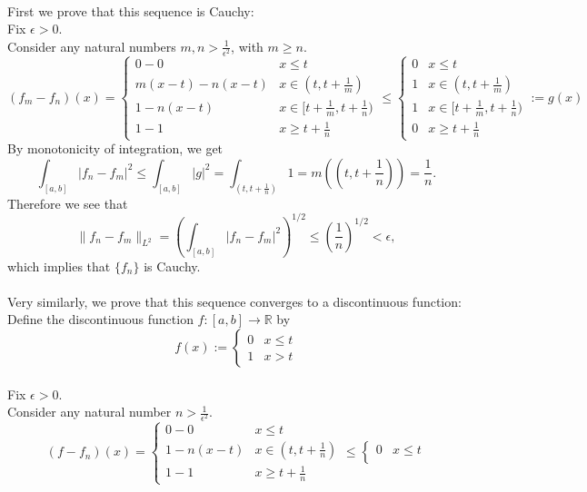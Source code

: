 \begin{enumerate}
    \\First we prove that this sequence is Cauchy:
    \\Fix $\epsilon>0$.
    \\Consider any natural numbers $m,n>\frac{1}{\epsilon^2}$, with $m\ge n$.
    \[
        (f_m-f_n)(x)=
        \begin{cases}
            0-0 &x\le t\\
            m(x-t)-n(x-t)&x\in(t,t+\frac{1}{m})\\
            1-n(x-t)&x\in[t+\frac{1}{m},t+\frac{1}{n})\\
            1-1 &x\ge t+\frac{1}{n}
        \end{cases}
        \le
        \begin{cases}
            0 &x\le t\\
            1&x\in(t,t+\frac{1}{m})\\
            1&x\in[t+\frac{1}{m},t+\frac{1}{n})\\
            0 &x\ge t+\frac{1}{n}
        \end{cases}
        :=g(x)
    \]
    By monotonicity of integration, we get
    \[
        \int_{[a,b]}|f_n-f_m|^2\le\int_{[a,b]}|g|^2=\int_{(t,t+\frac{1}{n})}1=m((t,t+\frac{1}{n}))=\frac{1}{n}.
    \]
    Therefore we see that
    \[
        \|f_n-f_m\|_{L^2}=\left(\int_{[a,b]}|f_n-f_m|^2\right)^{1/2}\le\left(\frac{1}{n}\right)^{1/2}<\epsilon,
    \]
    which implies that $\{f_n\}$ is Cauchy.\\
    \\Very similarly, we prove that this sequence converges to a discontinuous function:
    \\Define the discontinuous function $f:[a,b]\to\mathbb{R}$ by
    \[
        f(x):=
        \begin{cases}
            0 &x\le t\\
            1 &x> t
        \end{cases}
    \]
    \\Fix $\epsilon>0$.
    \\Consider any natural number $n>\frac{1}{\epsilon^2}$.
    \[
        (f-f_n)(x)=
        \begin{cases}
            0-0 &x\le t\\
            1-n(x-t)&x\in(t,t+\frac{1}{n})\\
            1-1 &x\ge t+\frac{1}{n}
        \end{cases}
        \le
        \begin{cases}
            0 &x\le t\\

\end{cases}\]
\end{enumerate}
